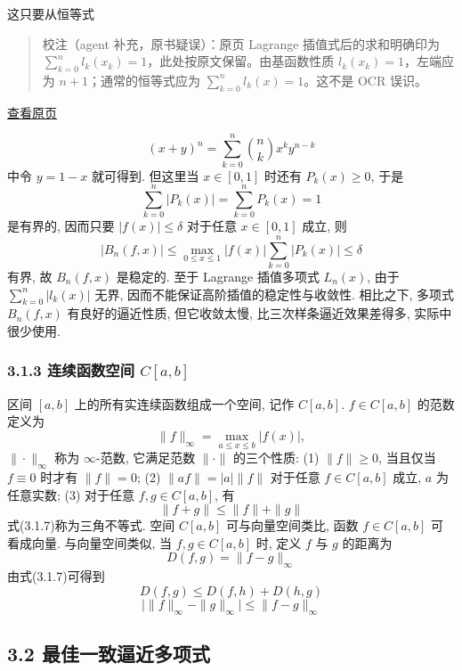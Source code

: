 \documentclass[
  10pt,
  fontset=fandol]{ctexart}
\begin{document}
这只要从恒等式

\begin{quote}
校注（agent 补充，原书疑误）：原页 Lagrange 插值式后的求和明确印为 \(\sum_{k=0}^{n}l_k(x_k)=1\)，此处按原文保留。由基函数性质 \(l_k(x_k)=1\)，左端应为 \(n+1\)；通常的恒等式应为 \(\sum_{k=0}^{n}l_k(x)=1\)。这不是 OCR 误识。
\end{quote}

\href{../../source-images/pdf-060.jpeg}{查看原页}

\[
(x+y)^n = \sum_{k=0}^{n} \binom{n}{k} x^k y^{n-k} \tag{3.1.6}
\] 中令 \(y=1-x\) 就可得到. 但这里当 \(x \in [0,1]\) 时还有 \(P_k(x) \geqslant 0\), 于是 \[
\sum_{k=0}^{n} |P_k(x)| = \sum_{k=0}^{n} P_k(x) = 1
\] 是有界的, 因而只要 \(|f(x)| \leqslant \delta\) 对于任意 \(x \in [0,1]\) 成立, 则 \[
|B_n(f,x)| \leqslant \max_{0 \leqslant x \leqslant 1} |f(x)| \sum_{k=0}^{n} |P_k(x)| \leqslant \delta
\] 有界, 故 \(B_n(f,x)\) 是稳定的. 至于 Lagrange 插值多项式 \(L_n(x)\), 由于 \(\sum_{k=0}^{n} |l_k(x)|\) 无界, 因而不能保证高阶插值的稳定性与收敛性. 相比之下, 多项式 \(B_n(f,x)\) 有良好的逼近性质, 但它收敛太慢, 比三次样条逼近效果差得多, 实际中很少使用.

\subsubsection{\texorpdfstring{3.1.3 连续函数空间 \(C[a,b]\)}{3.1.3 连续函数空间 C{[}a,b{]}}}\label{ux8fdeux7eedux51fdux6570ux7a7aux95f4-cab}

区间 \([a,b]\) 上的所有实连续函数组成一个空间, 记作 \(C[a,b]\). \(f \in C[a,b]\) 的范数定义为 \[
\|f\|_\infty = \max_{a \leqslant x \leqslant b} |f(x)| ,
\] \(\|\cdot\|_\infty\) 称为 \(\infty\)-范数, 它满足范数 \(\|\cdot\|\) 的三个性质: (1) \(\|f\| \geqslant 0\), 当且仅当 \(f \equiv 0\) 时才有 \(\|f\| = 0\); (2) \(\|af\| = |a| \|f\|\) 对于任意 \(f \in C[a,b]\) 成立, \(a\) 为任意实数; (3) 对于任意 \(f,g \in C[a,b]\), 有 \[
\|f+g\| \leqslant \|f\| + \|g\| \tag{3.1.7}
\] 式(3.1.7)称为三角不等式. 空间 \(C[a,b]\) 可与向量空间类比, 函数 \(f \in C[a,b]\) 可看成向量. 与向量空间类似, 当 \(f,g \in C[a,b]\) 时, 定义 \(f\) 与 \(g\) 的距离为 \[
D(f,g) = \|f-g\|_\infty \tag{3.1.8}
\] 由式(3.1.7)可得到 \[
D(f,g) \leqslant D(f,h) + D(h,g) \tag{3.1.9}
\] \[
\bigl|\|f\|_\infty - \|g\|_\infty\bigr| \leqslant \|f-g\|_\infty \tag{3.1.10}
\]

\subsection{3.2 最佳一致逼近多项式}\label{ux6700ux4f73ux4e00ux81f4ux903cux8fd1ux591aux9879ux5f0f}
\end{document}

